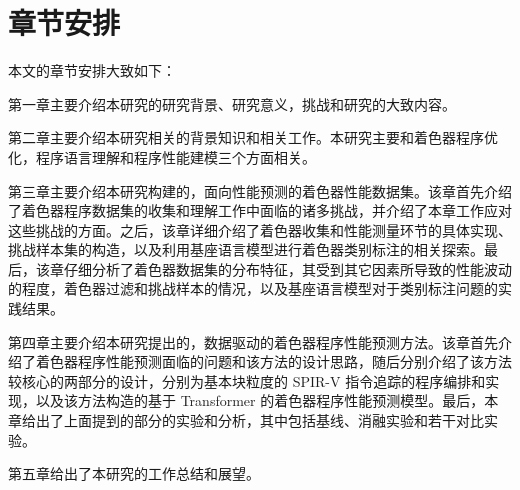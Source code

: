 \section{{\amend 章节安排}}

本文的章节安排大致如下：

第一章主要介绍本研究的研究背景、研究意义，挑战和研究的大致内容。

第二章主要介绍本研究相关的背景知识和相关工作。本研究主要和着色器程序优化，程序语言理解和程序性能建模三个方面相关。

{\added 第三章主要介绍本研究构建的，面向性能预测的着色器性能数据集。该章首先介绍了着色器程序数据集的收集和理解工作中面临的诸多挑战，并介绍了本章工作应对这些挑战的方面。之后，该章详细介绍了着色器收集和性能测量环节的具体实现、挑战样本集的构造，以及利用基座语言模型进行着色器类别标注的相关探索。最后，该章仔细分析了着色器数据集的分布特征，其受到其它因素所导致的性能波动的程度，着色器过滤和挑战样本的情况，以及基座语言模型对于类别标注问题的实践结果。}

第四章主要介绍本研究提出的，数据驱动的着色器程序性能预测方法。该章首先介绍了着色器程序性能预测面临的问题和该方法的设计思路，随后分别介绍了该方法较核心的两部分的设计，分别为基本块粒度的 SPIR-V 指令追踪的程序编排和实现，以及该方法构造的{\amend 基于 Transformer 的着色器程序性能预测模型}。最后，本章给出了上面提到的部分的实验和分析{\amend，其中包括基线、消融实验和若干对比实验。}

第五章给出了本研究的工作总结和展望。